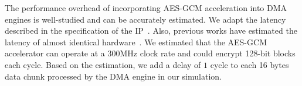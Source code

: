 

 The performance overhead of incorporating AES-GCM acceleration into DMA engines is well-studied and can be accurately estimated. We adapt the latency described in the specification of the IP~\cite{aes-opencore}. Also, previous works have estimated the latency of almost identical hardware~\cite{invisimem, obfusmem}. We estimated that the AES-GCM accelerator can operate at a $300$MHz clock rate and could encrypt 128-bit blocks each cycle. Based on the estimation, we add a delay of $1$ cycle to each 16 bytes data chunk processed by the DMA engine in our simulation.















